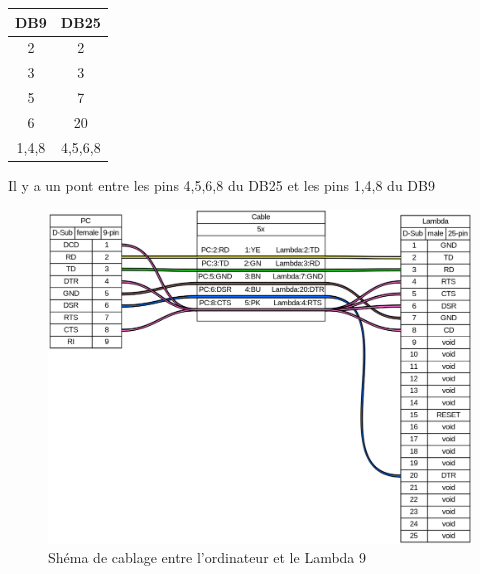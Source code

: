 \documentclass{article}
\begin{document}
\begin{table}
\begin{tabular}{|c|c|}
\hline
DB9   & DB25    \\ \hline
2     & 2       \\ \hline
3     & 3       \\ \hline
5     & 7       \\ \hline
6     & 20      \\ \hline
1,4,8 & 4,5,6,8 \\ \hline
\end{tabular}
\end{table}
Il y a un pont entre les pins 4,5,6,8 du DB25 et les pins 1,4,8 du DB9
\begin{figure}[h]
	\centering
	\includegraphics[width=1\textwidth]{cableLambda.png}
	\caption{Shéma de cablage entre l'ordinateur et le Lambda 9}
	\label{fig:cableLambda}
\end{figure}
\end{document}
